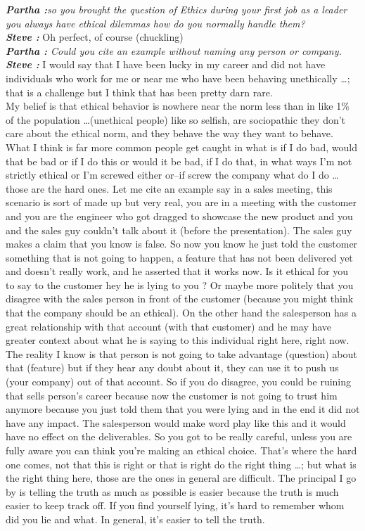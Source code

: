 \documentclass[a4paper, 12pt]{article}
\begin{document}
\begin{flushleft}
        \textit {\textbf {Partha :}so you brought the question of Ethics during your first job as a leader you always have ethical dilemmas how do you normally handle them?} \\
        \textit {\textbf {Steve :}} Oh perfect, of course (chuckling) \\
        \textit {\textbf {Partha :} Could you cite an example without naming any person or company. } \\
        \textit {\textbf {Steve :}} I would say that I have been lucky in my career and did not have individuals who work for me or near me who have been behaving unethically \ldots; that is a challenge but I think that has been pretty darn rare. \\
        My belief is that ethical behavior is nowhere near the norm less than in like 1\% of the population \ldots (unethical people) like so selfish, are sociopathic they don't care about the ethical norm, and they behave the way they want to behave. What I think is far more common people get caught in what is if I do bad, would that be bad or if I do this or would it be bad, if I do that, in what ways I'm not strictly ethical or I'm screwed either or--if screw the company what do I do \ldots those are the hard ones. Let me cite an example say in a sales meeting, this scenario is sort of  made up but very real, you are in a meeting with the customer and you are the engineer who got dragged to showcase the new product and you and the sales guy couldn't talk about it (before the presentation). The sales guy makes a claim that you know is false. So now you know he just told the customer something that is not going to happen, a feature that has not been delivered yet and doesn't really work, and he asserted that it works now. Is it ethical for you to say to the customer hey he is lying to you ? Or maybe more politely that you disagree with the sales person in front of the customer (because you might think that the company should be an ethical). On the other hand the salesperson has a great relationship with that account (with that customer) and he may have greater context about what he is saying to this individual right here, right now.  The reality I know is that person is not going to take advantage (question) about that (feature) but if they hear any doubt about it, they can use it to push us (your company) out of that account. So if you do disagree, you could be ruining that sells person's career because now the customer is not going to trust him anymore because you just told them that you were lying and in the end it did not have any impact. The salesperson would make word play like this and it would have no effect on the deliverables. So you got to be really careful, unless you are fully aware you can think you're making an ethical choice. That's where the hard one comes, not that this is right or that is right do the right thing \ldots; but what is the right thing here, those are the ones in general are difficult. The principal I go by is telling the truth as much as possible is easier because the truth is much easier to keep track off. If you find yourself lying,  it's hard to remember whom did you lie and what. In general, it's easier to tell the truth. 
\end{flushleft}
\end{document}
